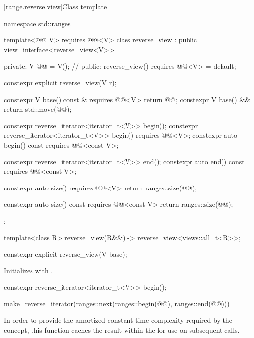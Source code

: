 [range.reverse.view]{Class template }

%
%
%
\begin{codeblock}
namespace std::ranges {
  template<@@ V>
    requires @@<V>
  class reverse_view : public view_interface<reverse_view<V>> {
  private:
    V @@ = V();  // \expos
  public:
    reverse_view() requires @@<V> = default;

    constexpr explicit reverse_view(V r);

    constexpr V base() const & requires @@<V> { return @@; }
    constexpr V base() && { return std::move(@@); }

    constexpr reverse_iterator<iterator_t<V>> begin();
    constexpr reverse_iterator<iterator_t<V>> begin() requires @@<V>;
    constexpr auto begin() const requires @@<const V>;

    constexpr reverse_iterator<iterator_t<V>> end();
    constexpr auto end() const requires @@<const V>;

    constexpr auto size() requires @@<V> {
      return ranges::size(@@);
    }

    constexpr auto size() const requires @@<const V> {
      return ranges::size(@@);
    }
  };

  template<class R>
    reverse_view(R&&) -> reverse_view<views::all_t<R>>;
}
\end{codeblock}

%
\begin{itemdecl}
constexpr explicit reverse_view(V base);
\end{itemdecl}

\begin{itemdescr}
\pnum
\effects
Initializes  with .
\end{itemdescr}

%
\begin{itemdecl}
constexpr reverse_iterator<iterator_t<V>> begin();
\end{itemdecl}

\begin{itemdescr}
\pnum
\returns
\begin{codeblock}
make_reverse_iterator(ranges::next(ranges::begin(@@), ranges::end(@@)))
\end{codeblock}

\pnum
\remarks
In order to provide the amortized constant time complexity required by
the  concept, this function caches the result within the
 for use on subsequent calls.
\end{itemdescr}

